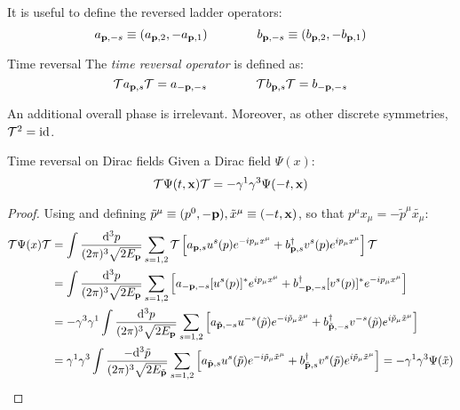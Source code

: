 It is useful to define the reversed ladder operators:
\begin{equation}
  a_{\mathbf{p},-s} \equiv (a_{\mathbf{p},2} , -a_{\mathbf{p},1})
  \qquad \qquad
  b_{\mathbf{p},-s} \equiv (b_{\mathbf{p},2} , -b_{\mathbf{p},1})
\end{equation}

\begin{definition}{Time reversal}{}
  The \textit{time reversal operator} is defined as:
  \begin{equation}
    \mathcal{T} a_{\mathbf{p},s} \mathcal{T} = a_{-\mathbf{p},-s}
    \qquad \qquad
    \mathcal{T} b_{\mathbf{p},s} \mathcal{T} = b_{-\mathbf{p},-s}
  \end{equation}
\end{definition}

An additional overall phase is irrelevant. Moreover, as other discrete symmetries, $ \mathcal{T}^2 = \operatorname{id} $.

\begin{proposition}{Time reversal on Dirac fields}{}
  Given a Dirac field $ \Psi(x) $:
  \begin{equation}
    \mathcal{T} \Psi(t,\mathbf{x}) \mathcal{T} = - \gamma^1 \gamma^3 \Psi(-t,\mathbf{x})
  \end{equation}
 \end{proposition}

 \begin{proofbox}
  \begin{proof}
    Using  and defining $ \tilde{p}^\mu \equiv (p^0,-\mathbf{p}) , \tilde{x}^\mu \equiv (-t,\mathbf{x}) $, so that $ p^\mu x_\mu = -\tilde{p}^\mu \tilde{x_\mu} $:
    \begin{equation*}
      \begin{split}
        \mathcal{T} \Psi(x) \mathcal{T}
        &= \int \frac{\mathrm{d}^3p}{(2\pi)^3 \sqrt{2E_{\mathbf{p}}}} \sum_{s = 1,2} \mathcal{T} \left[ a_{\mathbf{p},s} u^s(p) e^{-i p_\mu x^\mu} + b_{\mathbf{p},s}^\dagger v^s(p) e^{i p_\mu x^\mu} \right] \mathcal{T} \\
        &= \int \frac{\mathrm{d}^3p}{(2\pi)^3 \sqrt{2E_{\mathbf{p}}}} \sum_{s = 1,2} \left[ a_{-\mathbf{p},-s} [u^s(p)]^* e^{i p_\mu x^\mu} + b_{-\mathbf{p},-s}^\dagger [v^s(p)]^* e^{-i p_\mu x^\mu} \right] \\
        &= - \gamma^3 \gamma^1 \int \frac{\mathrm{d}^3p}{(2\pi)^3 \sqrt{2E_{\mathbf{p}}}} \sum_{s = 1,2} \left[ a_{\tilde{\mathbf{p}},-s} u^{-s}(\tilde{p}) e^{-i \tilde{p}_\mu \tilde{x}^\mu} + b_{\tilde{\mathbf{p}},-s}^\dagger v^{-s}(\tilde{p}) e^{i \tilde{p}_\mu \tilde{x}^\mu} \right] \\
        &= \gamma^1 \gamma^3 \int \frac{-\mathrm{d}^3\tilde{p}}{(2\pi)^3 \sqrt{2E_{\tilde{\mathbf{p}}}}} \sum_{s = 1,2} \left[ a_{\tilde{\mathbf{p}},s} u^s(\tilde{p}) e^{-i \tilde{p}_\mu \tilde{x}^\mu} + b_{\tilde{\mathbf{p}},s}^\dagger v^s(\tilde{p}) e^{i \tilde{p}_\mu \tilde{x}^\mu} \right]
        = - \gamma^1 \gamma^3 \Psi(\tilde{x})
      \end{split}
    \end{equation*}
  \end{proof}
 \end{proofbox}

